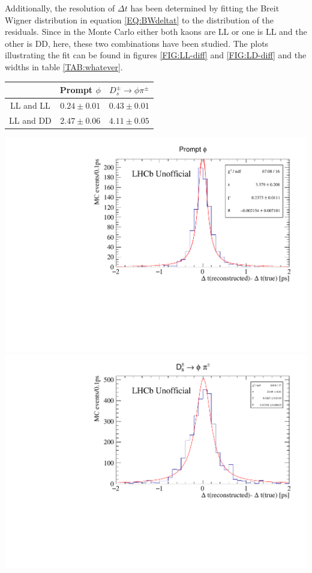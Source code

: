 Additionally, the resolution of $\Delta t$ has been determined by fitting the Breit Wigner distribution in equation \eqref{EQ:BWdeltat} to the distribution of the residuals. Since in the Monte Carlo either both kaons are LL or one is LL and the other is DD, here, these two combinations have been studied. The plots illustrating the fit can be found in figures \ref{FIG:LL-diff} and \ref{FIG:LD-diff} and the widths in table \ref{TAB:whatever}.



\begin{center}
\begin{tabular}{c|cc}
 & Prompt $\phi$ & $D_s^\pm \rightarrow \phi \pi^\pm$ \\ 
\hline 
LL and LL & $0.24 \pm 0.01$ & $0.43 \pm 0.01$ \\ 
LL and DD & $2.47 \pm 0.06$ & $4.11 \pm 0.05$ \\ 
\end{tabular} 
 \label{TAB:whatever}
\end{center}


\begin{center}
\includegraphics[width=.49\textwidth]{figs/time_res_incl/timeResolution-DeltaTauLL.pdf}
\includegraphics[width=.49\textwidth]{figs/time_res_Ds/timeResolution-DeltaTauLL.pdf}
\label{FIG:LL-diff}
\end{center}


